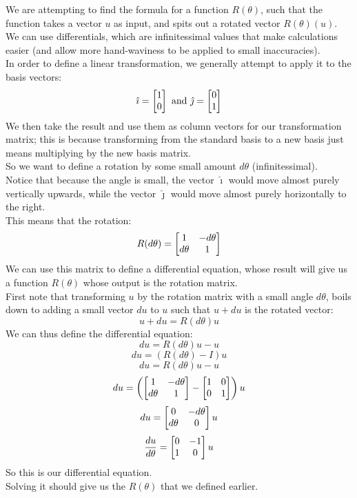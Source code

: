 \documentclass[12pt]{article}
\begin{document}
We are attempting to find the formula
for a function $R(\theta)$,
such that the function takes
a vector $u$ as input,
and spits out a rotated vector $R(\theta)(u)$. \\
We can use differentials, which are infinitessimal
values that make calculations easier
(and allow more hand-waviness to be applied
to small inaccuracies). \\

In order to define a linear transformation,
we generally attempt to apply it to
the basis vectors:
\[ \hat{\imath}  = \begin{bmatrix} {1}\\{0} \end{bmatrix} \text{ and } 
\hat{\jmath} = \begin{bmatrix} {0}\\{1} \end{bmatrix} \]
We then take the result and use them
as column vectors for our transformation
matrix; this is because transforming
from the standard basis to a new basis
just means multiplying by the new basis
matrix. \\

So we want to define a rotation by some
small amount $d\theta$ (infinitessimal). \\
Notice that because the angle is small,
the vector $\hat{\imath}$ would move almost
purely vertically upwards,
while the vector $\hat{\jmath}$
would move almost purely horizontally
to the right. \\
This means that the rotation:
\[ R(d\theta) 
= \begin{bmatrix} {1}&{-d\theta}\\{d\theta}&{1} \end{bmatrix} \]
We can use this matrix to define
a differential equation,
whose result will give us a function
$R(\theta)$ whose output is
the rotation matrix. \\

First note that transforming $u$
by the rotation matrix with a small angle $d\theta$,
boils down to adding a small vector $du$
to $u$ such that $u + du$
is the rotated vector:
\[ u + du = R(d\theta)u  \]
We can thus define the differential equation:
\[ du = R(d\theta)u - u \]
\[ du = (R(d\theta) - I)u \]
\[ du = R(d\theta)u - u \]
\[ du = \left( \begin{bmatrix} {1} & {-d\theta} \\ {d\theta} & {1} \end{bmatrix}
- \begin{bmatrix} {1} & {0} \\ {0} & {1} \end{bmatrix} \right)u \]
\[ du = \begin{bmatrix} {0} & {-d\theta} \\ {d\theta} & {0} \end{bmatrix}u \]
\[ \dfrac{du}{d\theta} 
= \begin{bmatrix} {0} & {-1} \\ {1} & {0} \end{bmatrix} u \]
So this is our differential equation. \\
Solving it should give us the $R(\theta)$
that we defined earlier. \\
\end{document}

